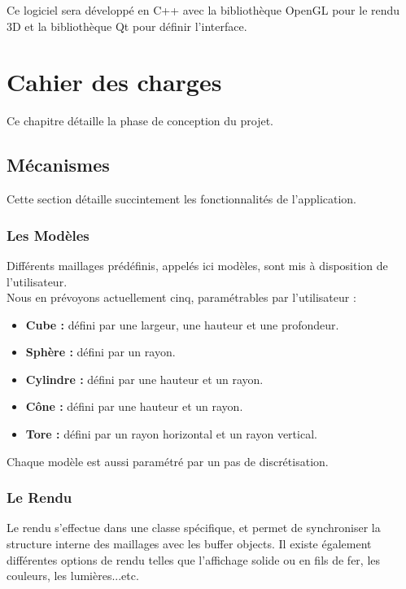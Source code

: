 \documentclass[a4paper]{memoir}
\begin{document}
			Ce logiciel sera développé en C++ avec la bibliothèque OpenGL pour le rendu 3D et la bibliothèque Qt pour définir l'interface.

	\chapter{Cahier des charges}
		Ce chapitre détaille la phase de conception du projet.
			
		\section{Mécanismes}
			Cette section détaille succintement les fonctionnalités de l'application.
			
			\subsection{Les Modèles}
				\label{model-cdc}
				Différents maillages prédéfinis, appelés ici modèles, sont mis à disposition de l'utilisateur.\\
				Nous en prévoyons actuellement cinq, paramétrables par l'utilisateur :
				\begin{itemize}
					\item \textbf{Cube :} défini par une largeur, une hauteur et une profondeur.
					\item \textbf{Sphère :} défini par un rayon.
					\item \textbf{Cylindre :} défini par une hauteur et un rayon.
					\item \textbf{Cône :} défini par une hauteur et un rayon.
					\item \textbf{Tore :} défini par un rayon horizontal et un rayon vertical.
				\end{itemize}
				Chaque modèle est aussi paramétré par un pas de discrétisation.
				
			\subsection{Le Rendu}
				Le rendu s'effectue dans une classe spécifique, et permet de synchroniser la structure interne des maillages avec les buffer objects. Il 
				existe également différentes options de rendu telles que l'affichage solide ou en fils de fer, les couleurs, les lumières...etc.
\end{document}
